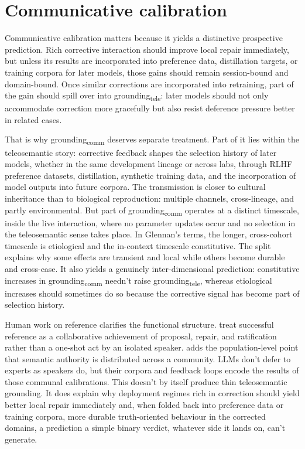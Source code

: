 \documentclass[12pt]{article}
\newcommand{\gtele}{grounding\textsubscript{tele}}
\newcommand{\gcomm}{grounding\textsubscript{comm}}
\begin{document}
\section{Communicative calibration}
\label{sec:calibration}

Communicative calibration matters because it yields a distinctive prospective prediction. Rich corrective interaction should improve local repair immediately, but unless its results are incorporated into preference data, distillation targets, or training corpora for later models, those gains should remain session-bound and domain-bound. Once similar corrections are incorporated into retraining, part of the gain should spill over into \gtele{}: later models should not only accommodate correction more gracefully but also resist deference pressure better in related cases.

That is why \gcomm{} deserves separate treatment. Part of it lies within the teleosemantic story: corrective feedback shapes the selection history of later models, whether in the same development lineage or across labs, through RLHF preference datasets, distillation, synthetic training data, and the incorporation of model outputs into future corpora. The transmission is closer to cultural inheritance than to biological reproduction: multiple channels, cross-lineage, and partly environmental. But part of \gcomm{} operates at a distinct timescale, inside the live interaction, where no parameter updates occur and no selection in the teleosemantic sense takes place. In Glennan's terms, the longer, cross-cohort timescale is etiological and the in-context timescale constitutive. The split explains why some effects are transient and local while others become durable and cross-case. It also yields a genuinely inter-dimensional prediction: constitutive increases in \gcomm{} needn't raise \gtele{}, whereas etiological increases should sometimes do so because the corrective signal has become part of selection history.

Human work on reference clarifies the functional structure. \textcite{clark_wilkes_gibbs_1986_referring} treat successful reference as a collaborative achievement of proposal, repair, and ratification rather than a one-shot act by an isolated speaker. \textcite{putnam_1975_meaning_of_meaning} adds the population-level point that semantic authority is distributed across a community. LLMs don't defer to experts as speakers do, but their corpora and feedback loops encode the results of those communal calibrations. This doesn't by itself produce thin teleosemantic grounding. It does explain why deployment regimes rich in correction should yield better local repair immediately and, when folded back into preference data or training corpora, more durable truth-oriented behaviour in the corrected domains, a prediction a simple binary verdict, whatever side it lands on, can't generate.
\end{document}
